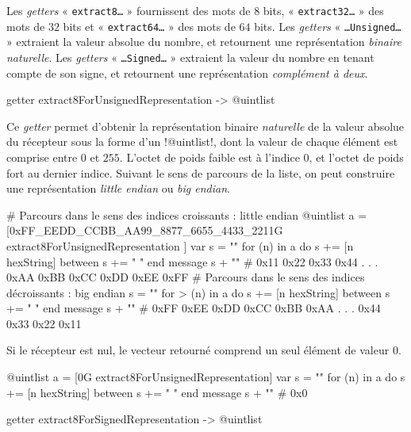 Les \emph{getters} « \texttt{extract8…} » fournissent des mots de $8$ bits, « \texttt{extract32…} »  des mots de $32$ bits et « \texttt{extract64…} »  des mots de $64$ bits. Les \emph{getters} « \texttt{…Unsigned…} » extraient la valeur absolue du nombre, et retournent une représentation \emph{binaire naturelle}. Les \emph{getters} « \texttt{…Signed…} » extraient la valeur du nombre en tenant compte de son signe, et retournent une représentation \emph{complément à deux}.


\begin{galgas3box}
getter extract8ForUnsignedRepresentation -> @uintlist
\end{galgas3box}

Ce \emph{getter} permet d'obtenir la représentation binaire \emph{naturelle} de la valeur absolue du récepteur sous la forme d'un \ggst!@uintlist!, dont la valeur de chaque élément est comprise entre $0$ et $255$. L'octet de poids faible est à l'indice $0$, et l'octet de poids fort au dernier indice. Suivant le sens de parcours de la liste, on peut construire une représentation \emph{little endian} ou \emph{big endian}.

\begin{galgas3}
# Parcours dans le sens des indices croissants : little endian
@uintlist a = [0xFF_EEDD_CCBB_AA99_8877_6655_4433_2211G
  extract8ForUnsignedRepresentation
]
var s = ""
for (n) in a
  do s += [n hexString]
  between s += " "
end
message s + "\n" # 0x11 0x22 0x33 0x44 . . . 0xAA 0xBB 0xCC 0xDD 0xEE 0xFF
# Parcours dans le sens des indices décroissants : big endian
s = ""
for > (n) in a
  do s += [n hexString]
  between s += " "
end
message s + "\n" # 0xFF 0xEE 0xDD 0xCC 0xBB 0xAA . . . 0x44 0x33 0x22 0x11
\end{galgas3}

Si le récepteur est nul, le vecteur retourné comprend un seul élément de valeur $0$.

\begin{galgas3}
@uintlist a = [0G extract8ForUnsignedRepresentation]
var s = ""
for (n) in a
  do s += [n hexString]
  between s += " "
end
message s + "\n" # 0x0
\end{galgas3}


\begin{galgas3box}
getter extract8ForSignedRepresentation -> @uintlist
\end{galgas3box}

